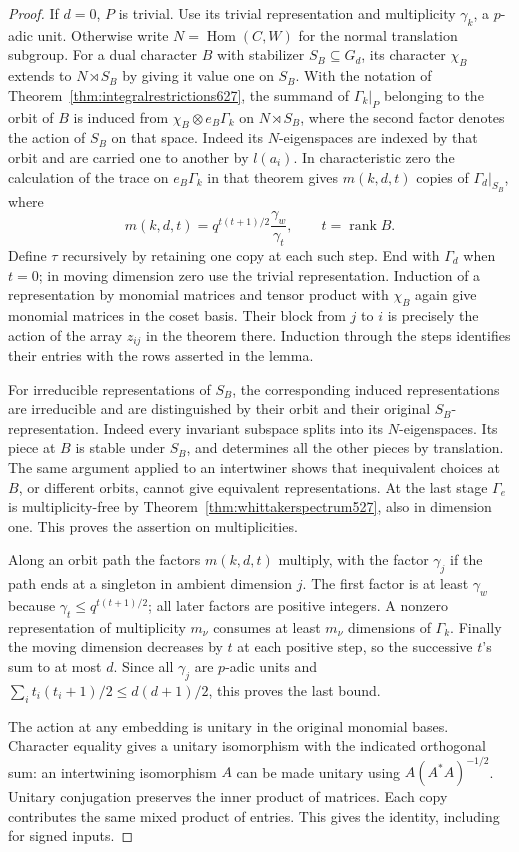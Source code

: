 \documentclass[a4paper,11pt]{article}
\theoremstyle{definition}
\theoremstyle{remark}
\numberwithin{equation}{section}
\begin{document}
\begin{proof}
If \(d=0\), \(P\) is trivial. Use its trivial representation and
multiplicity \(\gamma_k\), a \(p\)-adic unit. Otherwise write
\(N=\operatorname{Hom}(C,W)\) for the normal translation subgroup.
For a dual character \(B\) with stabilizer \(S_B\subseteq G_d\),
its character \(\chi_B\) extends to \(N\rtimes S_B\) by giving it
value one on \(S_B\). With the notation of
Theorem~\ref{thm:integralrestrictions627}, the summand of
\(\Gamma_k|_P\) belonging to the orbit of \(B\) is induced from
\(\chi_B\otimes e_B\Gamma_k\) on \(N\rtimes S_B\), where the
second factor denotes the action of \(S_B\) on that space.
Indeed its \(N\)-eigenspaces are indexed by that orbit and are
carried one to another by \(l(a_i)\). In characteristic zero the
calculation of the trace on \(e_B\Gamma_k\) in that theorem gives
\(m(k,d,t)\) copies of \(\Gamma_d|_{S_B}\), where
\[
             m(k,d,t)=q^{t(t+1)/2}\frac{\gamma_w}{\gamma_t},
                    \qquad t=\operatorname{rank}B .
\]
Define \(\tau\) recursively by retaining one copy at each such
step. End with \(\Gamma_d\) when \(t=0\); in moving dimension
zero use the trivial representation. Induction of a representation
by monomial matrices and tensor product with \(\chi_B\) again give
monomial matrices in the coset basis. Their block from \(j\) to
\(i\) is precisely the action of the array \(z_{ij}\) in the
theorem there. Induction through the steps identifies their entries
with the rows asserted in the lemma.

For irreducible representations of \(S_B\), the corresponding
induced representations are irreducible and are distinguished by
their orbit and their original \(S_B\)-representation. Indeed
every invariant subspace splits into its \(N\)-eigenspaces.
Its piece at \(B\) is stable under \(S_B\), and determines all the
other pieces by translation. The same argument applied to an
intertwiner shows that inequivalent choices at \(B\), or different
orbits, cannot give equivalent representations. At the last stage
\(\Gamma_e\) is multiplicity-free by
Theorem~\ref{thm:whittakerspectrum527}, also in dimension one.
This proves the assertion on multiplicities.

Along an orbit path the factors \(m(k,d,t)\) multiply, with
the factor \(\gamma_j\) if the path ends at a singleton in
ambient dimension \(j\). The first factor is at least \(\gamma_w\)
because \(\gamma_t\le q^{t(t+1)/2}\); all later factors are
positive integers. A nonzero representation of multiplicity
\(m_\nu\) consumes at least \(m_\nu\) dimensions of \(\Gamma_k\).
Finally the moving dimension decreases by \(t\) at each positive
step, so the successive \(t\)'s sum to at most \(d\). Since all
\(\gamma_j\) are \(p\)-adic units and
\(\sum_i t_i(t_i+1)/2\le d(d+1)/2\), this proves the last bound.

The action at any embedding is unitary in the original monomial
bases. Character equality gives a unitary isomorphism with
the indicated orthogonal sum: an intertwining isomorphism \(A\)
can be made unitary using \(A(A^*A)^{-1/2}\).
Unitary conjugation preserves the inner product of matrices.
Each copy contributes the same mixed product of entries.
This gives the identity, including for signed inputs.
\end{proof}
\end{document}
